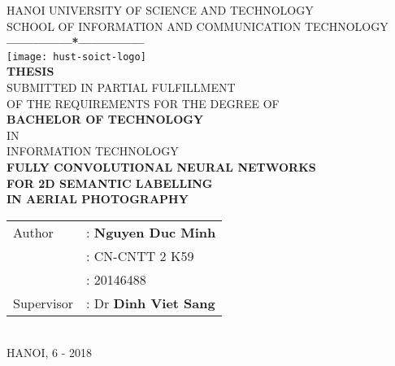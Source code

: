 \begin{spacing}{1.25}
    \thispagestyle{empty}
    \thisfancypage{\setlength{\fboxrule}{1pt}\doublebox}{}
    \begin{center}
        {\fontsize{17}{20}\selectfont HANOI UNIVERSITY OF SCIENCE AND TECHNOLOGY} \\
        {\fontsize{13}{17}\selectfont SCHOOL OF INFORMATION AND COMMUNICATION
        TECHNOLOGY} \\ [0.25cm]
        \textbf{---------------*---------------} \\ [1cm]
        \texttt{[image: hust-soict-logo]} \\ [1cm]
        {\fontsize{25}{30}\selectfont \textbf{THESIS}} \\ [0.25cm]
        {\fontsize{14}{17}\selectfont SUBMITTED IN PARTIAL FULFILLMENT \\
        OF THE REQUIREMENTS FOR THE DEGREE OF} \\ [0.5cm]
        {\fontsize{25}{30}\selectfont \textbf{BACHELOR OF TECHNOLOGY}} \\ [0.5cm]
        {\fontsize{14}{17}\selectfont IN} \\ [0.5cm]
        {\fontsize{22}{26}\selectfont INFORMATION TECHNOLOGY} \\ [0.5cm]
        {\fontsize{15}{15}\selectfont \textbf{FULLY CONVOLUTIONAL NEURAL NETWORKS
        \\FOR 2D SEMANTIC LABELLING\\IN AERIAL PHOTOGRAPHY}} \\ [2.25cm]
        \begin{tabular}{ l l }
            Author & : \textbf{Nguyen Duc Minh} \\
            & : CN-CNTT 2 K59 \\
            & : 20146488 \\ [0.5cm]
            Supervisor & : Dr \textbf{Dinh Viet Sang}
        \end{tabular} \\ [2.25cm]
        {\fontsize{17}{20}\selectfont HANOI, 6 - 2018}
    \end{center}
\end{spacing}
